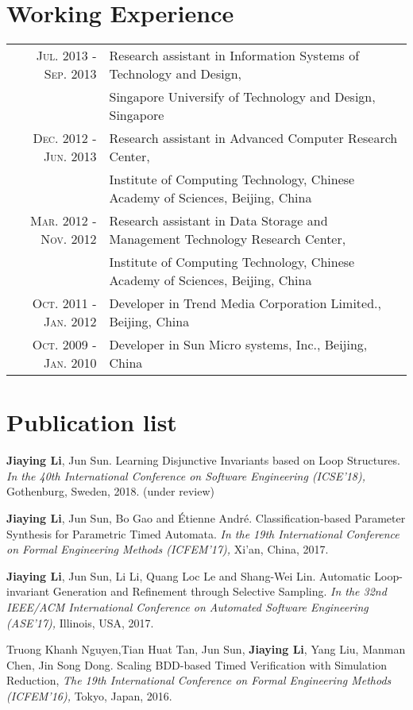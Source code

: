 \documentclass[a4paper,10pt]{article}
\begin{document}
\section{Working Experience}
\begin{tabular}{rl}	
	\textsc{Jul.} 2013 - \textsc{Sep.} 2013  & Research assistant in Information Systems of Technology and Design,\\
		 									 & Singapore Universify of Technology and Design, Singapore \\
	\textsc{Dec.} 2012 - \textsc{Jun.} 2013	 & Research assistant in Advanced Computer Research Center,\\
		 									 & Institute of Computing Technology, Chinese Academy of Sciences, Beijing, China \\
	\textsc{Mar.} 2012 - \textsc{Nov.} 2012  & Research assistant in Data Storage and Management Technology Research Center, \\
											 & Institute of Computing Technology, Chinese Academy of Sciences, Beijing, China \\
	\textsc{Oct.} 2011 - \textsc{Jan.} 2012  & Developer in Trend Media Corporation Limited., Beijing, China\\
	\textsc{Oct.} 2009 - \textsc{Jan.} 2010  & Developer in Sun Micro systems, Inc., Beijing, China\\
\end{tabular}


\section{Publication list}

\textbf{Jiaying Li}, Jun Sun. Learning Disjunctive Invariants based on Loop Structures. {\sl In the 40th International Conference on Software Engineering (ICSE'18),} Gothenburg, Sweden, 2018. (under review)

\textbf{Jiaying Li}, Jun Sun, Bo Gao and \'{E}tienne Andr\'{e}. Classification-based Parameter Synthesis for Parametric Timed Automata. {\sl In the 19th International Conference on Formal Engineering Methods (ICFEM'17),} Xi'an, China, 2017.

\textbf{Jiaying Li}, Jun Sun, Li Li, Quang Loc Le and Shang-Wei Lin. Automatic Loop-invariant Generation and Refinement through Selective Sampling. {\sl In the 32nd IEEE/ACM International Conference on Automated Software Engineering (ASE'17),} Illinois, USA, 2017.

Truong Khanh Nguyen,Tian Huat Tan, Jun Sun, \textbf{Jiaying Li}, Yang Liu, Manman Chen, Jin Song Dong. Scaling BDD-based Timed Verification with Simulation Reduction, {\sl The 19th International Conference on Formal Engineering Methods (ICFEM'16),} Tokyo, Japan, 2016. 
\end{document}

